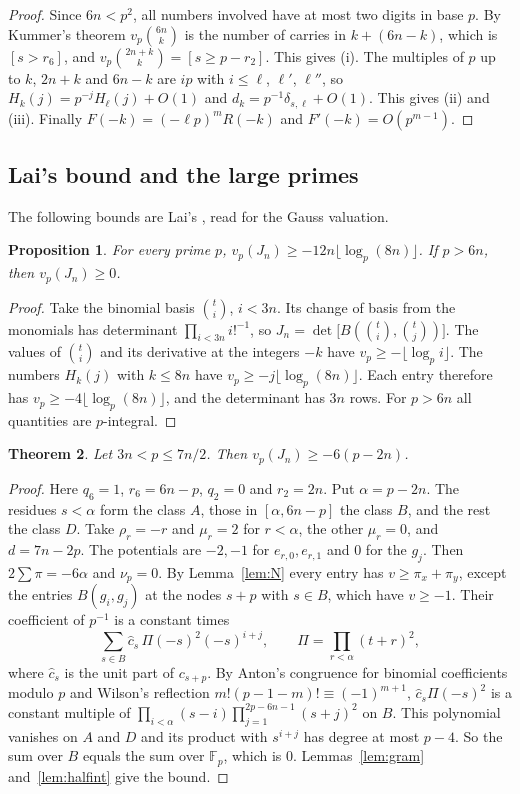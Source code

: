 \documentclass[11pt]{amsart}
\newtheorem{theorem}{Theorem}[section]
\newtheorem{proposition}[theorem]{Proposition}
\theoremstyle{definition}
\theoremstyle{remark}
\numberwithin{equation}{section}
\newcommand{\F}{\mathbb F}
\begin{document}
\begin{proof}
Since $6n<p^2$, all numbers involved have at most two digits in base $p$. By Kummer's theorem $v_p\binom{6n}k$ is the
number of carries in $k+(6n-k)$, which is $[s>r_6]$, and $v_p\binom{2n+k}k=[s\ge p-r_2]$. This gives (i). The
multiples of $p$ up to $k$, $2n+k$ and $6n-k$ are $ip$ with $i\le\ell$, $\ell'$, $\ell''$, so
$H_k(j)=p^{-j}H_\ell(j)+O(1)$ and $d_k=p^{-1}\delta_{s,\ell}+O(1)$. This gives (ii) and (iii). Finally
$F(-k)=(-\ell p)^mR(-k)$ and $F'(-k)=O(p^{m-1})$.
\end{proof}

\subsection{Lai's bound and the large primes}
The following bounds are Lai's \cite[Lemma~4.1]{Lai2026}, read for the Gauss valuation.

\begin{proposition}\label{prop:crude}
For every prime $p$, $v_p(J_n)\ge-12n\lfloor\log_p(8n)\rfloor$. If $p>6n$, then $v_p(J_n)\ge0$.
\end{proposition}

\begin{proof}
Take the binomial basis $\binom ti$, $i<3n$. Its change of basis from the monomials has determinant
$\prod_{i<3n}i!^{-1}$, so $J_n=\det\bigl[B(\binom ti,\binom tj)\bigr]$. The values of $\binom ti$ and its derivative at
the integers $-k$ have $v_p\ge-\lfloor\log_pi\rfloor$. The numbers $H_k(j)$ with $k\le8n$ have $v_p\ge-j\lfloor\log_p(8n)\rfloor$.
Each entry therefore has $v_p\ge-4\lfloor\log_p(8n)\rfloor$, and the determinant has $3n$ rows. For $p>6n$ all
quantities are $p$-integral.
\end{proof}

\begin{theorem}\label{thm:O}
Let $3n<p\le7n/2$. Then $v_p(J_n)\ge-6(p-2n)$.
\end{theorem}

\begin{proof}
Here $q_6=1$, $r_6=6n-p$, $q_2=0$ and $r_2=2n$. Put $\alpha=p-2n$. The residues $s<\alpha$ form the class $A$, those in
$[\alpha,6n-p]$ the class $B$, and the rest the class $D$. Take $\rho_r=-r$ and $\mu_r=2$ for $r<\alpha$, the other
$\mu_r=0$, and $d=7n-2p$. The potentials are $-2,-1$ for $e_{r,0},e_{r,1}$ and $0$ for the $g_j$. Then
$2\sum\pi=-6\alpha$ and $\nu_p=0$. By Lemma~\ref{lem:N} every entry has $v\ge\pi_x+\pi_y$, except the entries
$B(g_i,g_j)$ at the nodes $s+p$ with $s\in B$, which have $v\ge-1$. Their coefficient of $p^{-1}$ is a constant times
\[
 \sum_{s\in B}\hat c_s\,\Pi(-s)^2(-s)^{i+j},\qquad \Pi=\prod_{r<\alpha}(t+r)^2,
\]
where $\hat c_s$ is the unit part of $c_{s+p}$. By Anton's congruence for binomial coefficients modulo $p$
\cite[Theorem~1]{Granville97} and Wilson's reflection $m!(p-1-m)!\equiv(-1)^{m+1}$, $\hat c_s\Pi(-s)^2$ is a constant multiple of $\prod_{i<\alpha}(s-i)\prod_{j=1}^{2p-6n-1}(s+j)^2$ on $B$. This
polynomial vanishes on $A$ and $D$ and its product with $s^{i+j}$ has degree at most $p-4$. So the sum over $B$ equals
the sum over $\F_p$, which is $0$. Lemmas~\ref{lem:gram} and~\ref{lem:halfint} give the bound.
\end{proof}
\end{document}
